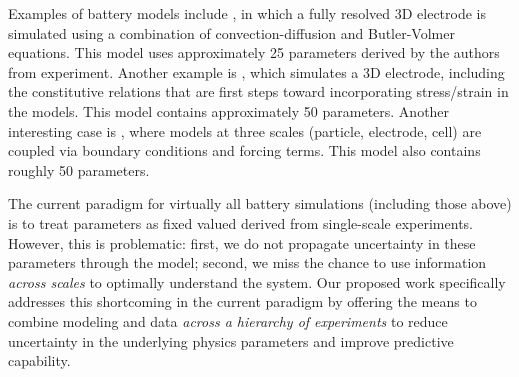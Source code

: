 \documentclass[11pt]{article}
\begin{document}
Examples of battery models include \cite{Less:2012}, in which a fully resolved 3D electrode is simulated using a combination
of convection-diffusion and Butler-Volmer equations. This model uses approximately 25 parameters derived by the authors from experiment.
Another example is \cite{Garcia2005}, which simulates a 3D electrode, including the constitutive relations that are first steps toward
incorporating stress/strain in the models. This model contains approximately 50 parameters.  Another interesting case is \cite{Kim-etal:2011}, where models at three scales (particle, electrode, cell) are coupled via boundary conditions and forcing terms. This model also contains roughly 50 parameters.

The current paradigm for virtually all battery simulations (including those above)
is to treat parameters as fixed valued derived from single-scale experiments.
However, this is problematic: first, we do not propagate uncertainty in 
these parameters through the model; second, we miss the chance to use information \emph{across scales} to optimally understand
the system.  Our proposed work specifically addresses this shortcoming in the current paradigm by offering the means to 
combine modeling and data \emph{across a hierarchy of experiments}
to reduce uncertainty in the underlying physics parameters and improve predictive capability.
\end{document}
